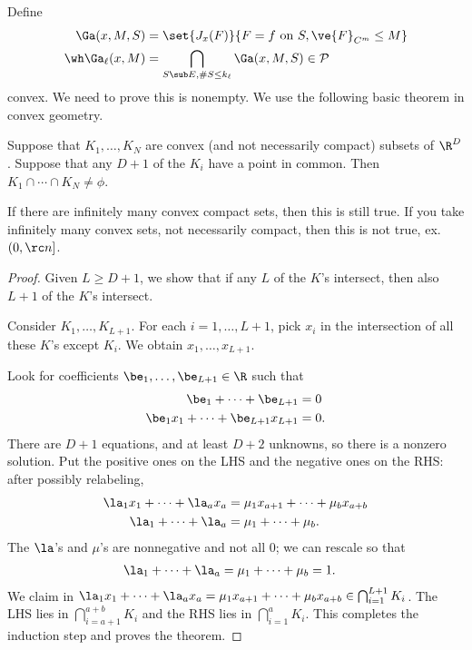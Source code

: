 Define 
\begin{align}
\Ga(x,M,S) &= \set{J_x(F)}{F=f\text{ on }S, \ve{F}_{C^m}\le M}\\
\wh \Ga_\ell(x,M) &= \bigcap_{S\sub E, \#S\le k_\ell} \Ga(x,M,S)\in \cal P
\end{align}
convex. We need to prove this is nonempty. We use the following basic theorem in convex geometry.
\begin{thm}\label{thm:helly}
Suppose that $K_1,\ldots, K_N$ are convex (and not necessarily compact) subsets of $\R^D$. 
Suppose that any $D+1$ of the $K_i$ have a point in common. Then $K_1\cap \cdots \cap K_N\ne \phi$.
\end{thm}
If there are infinitely many convex compact sets, then this is still true.
If you take infinitely many convex sets, not necessarily compact, then this is not true, ex. $(0,\rc n]$. 
\begin{proof}
Given $L\ge D+1$, we show that if any $L$ of the $K$'s intersect, then also $L+1$ of the $K$'s intersect.

Consider $K_1,\ldots, K_{L+1}$. For each $i=1,\ldots, L+1$, pick $x_i$ in the intersection of all these $K$'s except $K_i$. 
We obtain $x_1,\ldots, x_{L+1}$. 

Look for coefficients $\be_1,\ldots, \be_{L+1}\in \R$ such that 
\begin{align}
\be_1+\cdots + \be_{L+1}&=0\\
\be_1x_1+\cdots + \be_{L+1}x_{L+1}&=0.
\end{align}
There are $D+1$ equations, and at least $D+2$ unknowns, so there is a nonzero solution. Put the positive ones on the LHS and the negative ones on the RHS: after possibly relabeling,
\begin{align}
\la_1x_1+\cdots +\la_ax_a &= \mu_1x_{a+1}+\cdots + \mu_b x_{a+b}\\
\la_1+\cdots + \la_a &= \mu_1+\cdots +\mu_b.
\end{align}
The $\la$'s and $\mu$'s are nonnegative and not all 0; we can rescale so that 
\begin{align}
\la_1+\cdots + \la_a &= \mu_1+\cdots +\mu_b=1.
\end{align}
We claim in $\la_1x_1+\cdots +\la_ax_a = \mu_1x_{a+1}+\cdots + \mu_b x_{a+b} \in \bigcap_{i=1}^{L+1}K_i$. The LHS lies in 
$\bigcap_{i=a+1}^{a+b} K_i$ and the RHS lies in $\bigcap_{i=1}^a K_i$. This completes the induction step and proves the theorem. 
\end{proof}






